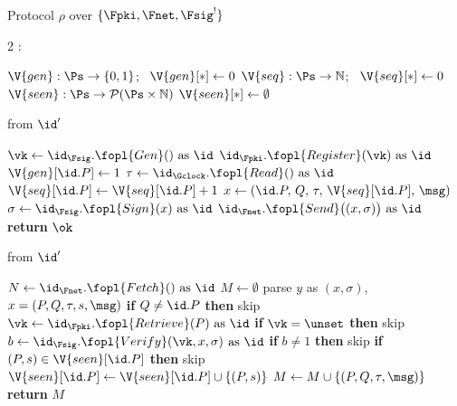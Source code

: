 \documentclass[10pt,oneside,openany]{book}
\theoremstyle{accentdef}
\theoremstyle{accentplain}
\begin{document}
\begin{interface}[nofloat]{Protocol $\rho$ over $\{\Fpki,\Fnet,\Fsig^{!}\}$ \\
\params{$\PID$, \quad $\Ps$, \quad $\admits$, \quad
$\uses := \{(\Fpki,\serves),\allowbreak(\Fnet,\serves),\allowbreak
(\Fsig^{!},\serves),\allowbreak(\Gclock,\serves)\}$, \quad
$\pars := \none$}}

{\scriptsize
\setlength{\columnsep}{1.4em}
\begin{multicols}{2}
:
\begin{algorithmic}[1]
\setcounter{contline}{0}\algcont
\State $\V{gen} : \Ps \to \{0,1\}$; \ $\V{gen}[*] \gets 0$
\State $\V{seq} : \Ps \to \mathbb{N}$; \ $\V{seq}[*] \gets 0$
\State $\V{seen} : \Ps \to \mathcal{P}(\Ps \times \mathbb{N})$
\State $\V{seen}[*] \gets \emptyset$
\algsave
\end{algorithmic}
\vspace{1.4ex}

 \quad from $\id'$
\begin{algorithmic}[1]
\algcont
{} \label{ln:rgen}
  \State $\vk \gets \id_{\Fsig}.\fopl{Gen}() \text{ as } \id$
  \State $\id_{\Fpki}.\fopl{Register}(\vk) \text{ as } \id$
  \State $\V{gen}[\id.P] \gets 1$
\EndIf
\State $\tau \gets \id_{\Gclock}.\fopl{Read}() \text{ as } \id$
\State $\V{seq}[\id.P] \gets \V{seq}[\id.P] + 1$
\State $x \gets (\id.P,\, Q,\, \tau,\, \V{seq}[\id.P],\, \msg)$
\State $\sigma \gets \id_{\Fsig}.\fopl{Sign}(x) \text{ as } \id$
\State $\id_{\Fnet}.\fopl{Send}\bigl((x,\sigma)\bigr) \text{ as } \id$ \label{ln:rsend}
\State \textbf{return} $\ok$
\algsave
\end{algorithmic}
\vspace{1.4ex}

\columnbreak

 \quad from $\id'$
\begin{algorithmic}[1]
\algcont
\State $N \gets \id_{\Fnet}.\fopl{Fetch}() \text{ as } \id$
\State $M \gets \emptyset$
 \label{ln:rloop}
  \State parse $y$ as $(x,\sigma)$, \ $x = (P,Q,\tau,s,\msg)$
  \State \textbf{if} $Q \neq \id.P$ \textbf{then} skip
  \State $\vk \gets \id_{\Fpki}.\fopl{Retrieve}(P) \text{ as } \id$
  \State \textbf{if} $\vk = \unset$ \textbf{then} skip
  \State $b \gets \id_{\Fsig}.\fopl{Verify}(\vk, x, \sigma)$ \label{ln:rverify}
  \Statex \quad $\text{as } \id$
  \State \textbf{if} $b \neq 1$ \textbf{then} skip
  \State \textbf{if} $(P,s) \in \V{seen}[\id.P]$ \textbf{then} skip \label{ln:rdedup}
  \State $\V{seen}[\id.P] \gets \V{seen}[\id.P] \cup \{(P,s)\}$
  \State $M \gets M \cup \{(P,Q,\tau,\msg)\}$
\EndFor
\State \textbf{return} $M$
\algsave
\end{algorithmic}
\end{multicols}}
\end{interface}
\end{document}
